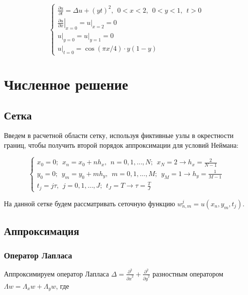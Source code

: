 \documentclass[a4paper]{article}
\begin{document}
\begin{equation}
\left\{\begin{array}{l}{\frac{\partial u}{\partial t}=\Delta u+(y t)^{2}, ~~ 0<x<2, ~~ 0<y<1, ~~ t>0} \\
{\left.\frac{\partial u}{\partial x}\right|_{x=0}=\left.u\right|_{x=2}=0} \\ 
{\left.u\right|_{y=0}=\left.u\right|_{y=1}=0} \\ 
{\left.u\right|_{t=0}=\cos (\pi x / 4) \cdot y(1-y)}\end{array}\right.
\end{equation}

\section{Численное решение}
\subsection{Сетка}

Введем в расчетной области сетку, используя фиктивные узлы в окрестности границ, чтобы получить второй порядок аппроксимации для условий Неймана:

\begin{equation}
\begin{cases}
x_0=0; ~~ x_n = x_0 + n h_x, ~~ n = 0,1,..., N; ~~ x_N = 2  \longrightarrow h_x = \frac{2}{N-1}\\
y_0=0; ~~ y_m = y_0 + m h_y, ~~ m = 0,1,..., M; ~~ y_M = 1  \longrightarrow h_y = \frac{1}{M-1}\\
t_j=j\tau, ~~ j=0,1,...,J; ~~ t_J=T \longrightarrow \tau= \frac{T}{J}
\end{cases}
\end{equation}

На данной сетке будем рассматривать
сеточную функцию $w^{j}_{n,m} = u(x_n,y_m,t_j)$.

\subsection{Аппроксимация}
\subsubsection{Оператор Лапласа}

Аппроксимируем оператор Лапласа $\Delta = \frac{\partial^2 }{{\partial x}^2} + \frac{\partial^2 }{{\partial y}^2}$
разностным оператором $\Lambda w = \Lambda _x w + \Lambda _y w$, где
\end{document}
